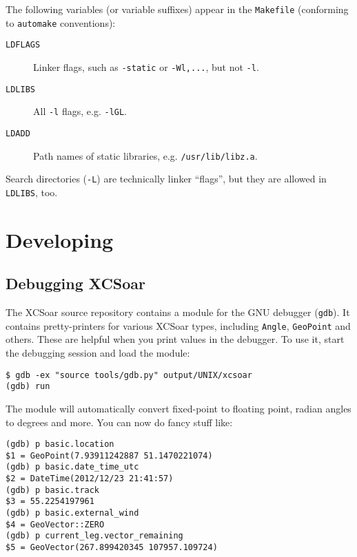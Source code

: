 \documentclass[a4paper,12pt]{refrep}
\begin{document}
The following variables (or variable suffixes) appear in the
\texttt{Makefile} (conforming to \texttt{automake} conventions):

\begin{description}
\item[\texttt{LDFLAGS}] Linker flags, such as \texttt{-static} or
  \texttt{-Wl,...}, but not \texttt{-l}.
\item[\texttt{LDLIBS}] All \texttt{-l} flags, e.g. \texttt{-lGL}.
\item[\texttt{LDADD}] Path names of static libraries,
  e.g. \texttt{/usr/lib/libz.a}.
\end{description}

Search directories (\texttt{-L}) are technically linker ``flags'', but
they are allowed in \texttt{LDLIBS}, too.


\chapter{Developing}

\section{Debugging XCSoar}

The XCSoar source repository contains a module for the GNU debugger
(\texttt{gdb}).  It contains pretty-printers for various XCSoar types,
including \texttt{Angle}, \texttt{GeoPoint} and others.  These are
helpful when you print values in the debugger.  To use it, start the
debugging session and load the module:

\begin{verbatim}
$ gdb -ex "source tools/gdb.py" output/UNIX/xcsoar
(gdb) run
\end{verbatim}

The module will automatically convert fixed-point to floating point,
radian angles to degrees and more.  You can now do fancy stuff like:

\begin{verbatim}
(gdb) p basic.location
$1 = GeoPoint(7.93911242887 51.1470221074)
(gdb) p basic.date_time_utc
$2 = DateTime(2012/12/23 21:41:57)
(gdb) p basic.track
$3 = 55.2254197961
(gdb) p basic.external_wind
$4 = GeoVector::ZERO
(gdb) p current_leg.vector_remaining
$5 = GeoVector(267.899420345 107957.109724)
\end{verbatim}



\end{document}
